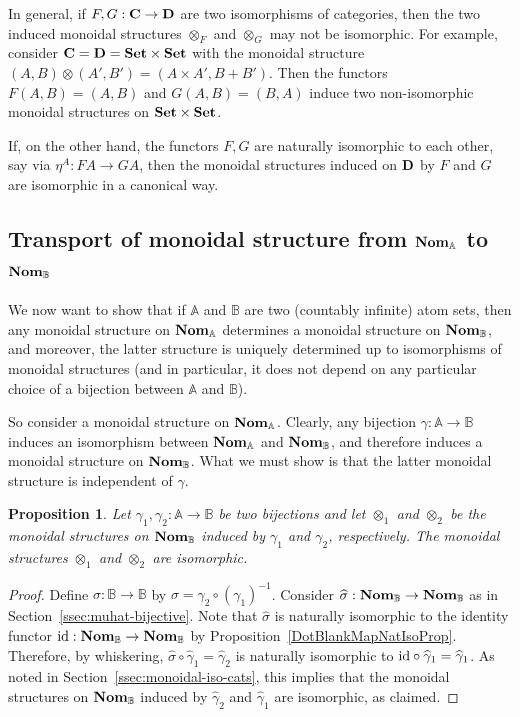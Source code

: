 \documentclass[11pt,a4paper]{amsart}
\theoremstyle{plain}
\newtheorem{xprop}[xtheorem]{Proposition}
\theoremstyle{definition}
\theoremstyle{remark}
\newcommand{\Nom}{\textrm{\bf Nom}}
\newcommand{\NomX}[1]{\Nom_{#1}}
\newcommand{\NomA}{\NomX{\aA}}
\newcommand{\NomB}{\NomX{\bB}}
\newcommand{\Set}{\textrm{\bf Set}}
\newcommand{\Cc}{\textrm{\bf{C}}}
\newcommand{\Dd}{\textrm{\bf{D}}}
\newcommand{\aA}{\mathbb{A}}
\newcommand{\bB}{\mathbb{B}}
\newcommand{\id}{\text{\textrm{id}}}
\newcommand{\sigmahat}{\widehat{\sigma}}
\newcommand{\inv}{^{-1}}
\begin{document}
In general, if $F,G:\Cc\to\Dd$ are two isomorphisms of categories,
then the two induced monoidal structures $\otimes_F$ and $\otimes_G$
may not be isomorphic. For example, consider $\Cc=\Dd=\Set\times\Set$ with
the monoidal structure $(A,B)\otimes(A',B')=(A\times A',B+B')$. Then
the functors $F(A,B)=(A,B)$ and $G(A,B)=(B,A)$ induce two
non-isomorphic monoidal structures on $\Set\times\Set$.

If, on the other hand, the functors $F,G$ are naturally isomorphic to
each other, say via $\eta^A:FA\to GA$, then the monoidal structures
induced on $\Dd$ by $F$ and $G$ are isomorphic in a canonical way.

\subsection{Transport of monoidal structure from $\NomA$ to $\NomB$}

We now want to show that if $\aA$ and $\bB$ are two (countably
infinite) atom sets, then any monoidal structure on $\Nom_{\aA}$
determines a monoidal structure on $\Nom_{\bB}$, and moreover, the
latter structure is uniquely determined up to isomorphisms of
monoidal structures (and in particular, it does not depend on any
particular choice of a bijection between $\aA$ and $\bB$).

So consider a monoidal structure on $\NomA$. Clearly, any bijection
$\gamma:\aA\to\bB$ induces an isomorphism between $\NomA$ and $\NomB$,
and therefore induces a monoidal structure on $\NomB$. What we must
show is that the latter monoidal structure is independent of $\gamma$.

\begin{xprop}\label{ISOProp}
Let $\gamma_1,\gamma_2:\aA\to \bB$ be two bijections and let
$\otimes_1$ and $\otimes_2$ be the monoidal structures on $\NomB$
induced by $\gamma_1$ and $\gamma_2$, respectively.  The monoidal structures $\otimes_1$ and $\otimes_2$ are isomorphic.
\end{xprop}

\begin{proof}
  Define $\sigma:\bB \to \bB$ by $\sigma=\gamma_2\circ (\gamma_1)\inv$.
  Consider $\sigmahat:\NomB\to\NomB$ as in
  Section~\ref{ssec:muhat-bijective}. Note that $\sigmahat$ is naturally
  isomorphic to the identity functor $\id:\NomB\to\NomB$ by
  Proposition~\ref{DotBlankMapNatIsoProp}. Therefore, by whiskering,
  $\sigmahat\circ\widehat\gamma_1=\widehat\gamma_2$ is naturally isomorphic
  to $\id\circ\widehat\gamma_1=\widehat\gamma_1$. As noted in
  Section~\ref{ssec:monoidal-iso-cats}, this implies that the monoidal
  structures on $\NomB$ induced by $\widehat\gamma_2$ and
  $\widehat\gamma_1$ are isomorphic, as claimed.
\end{proof}
\end{document}
